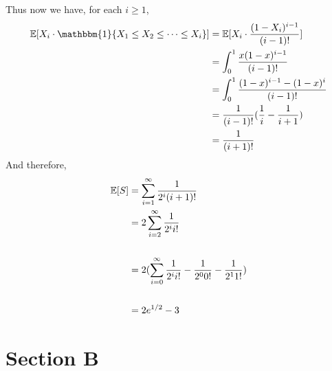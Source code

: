 \documentclass[11pt,a4paper]{article}
\begin{document}
\begin{enumerate}
        Thus now we have, for each $i\ge 1$, 
        \begin{align}
        	\bbE[ X_i\cdot \mathbbm{1}\{X_1\le X_2\le \cdots \le X_i\}]
        	&=\bbE[X_i\cdot \frac{(1-X_i)^{i-1}}{(i - 1)!}]
        	\nonumber\\
        	&=\int_0^1 \frac{x(1-x)^{i-1}}{(i-1)!}
        	\nonumber\\
        	&=\int_0^1 \frac{(1-x)^{i-1} - (1-x)^i}{(i-1)!}
        	\nonumber\\
        	&=\frac{1}{(i-1)!}(\frac{1}{i} - \frac{1}{i + 1})
        	\nonumber\\
        	&=\frac{1}{(i + 1)!}
        \end{align}
        And therefore, 
        \begin{align}
        	{\mathbb E}[S]&=\sum_{i=1}^{\infty}\frac{1}{2^i(i+1)!}
        	\nonumber\\
        	&=2\sum_{i=2}^{\infty}\frac{1}{2^i i!}
        	\nonumber\\
        	\\&=2(\sum_{i=0}^{\infty}\frac{1}{2^i i!} - \frac{1}{2^0 0!} - \frac{1}{2^1 1!})
        	\nonumber\\
        	\\&=2e^{1/2} - 3
        \end{align}
	\end{enumerate}
	
	\section*{Section B}
	
\end{document}
